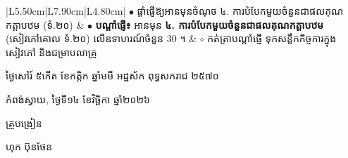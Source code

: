 \documentclass[a4paper,10pt]{article}
\begin{document}
{\begin{longtable}{|L{5.50cm}|L{7.90cm}|L{4.80cm}|}
$\bullet$ ផ្ដាំផ្ញើឱ្យអានមុនចំណុច ៤. ការបំបែកមួយចំនួនជាផលគុណកត្តាបឋម (ទំ.២០)
&
$\bullet$ \textbf{បណ្ដាំផ្ញើ៖} អានមុន \textbf{៤. ការបំបែកមួយចំនួនជាផលគុណកត្តាបឋម} (សៀវភៅគោល ទំ.២០) លើឧទាហរណ៍ចំនួន $30$ ។
&
$\circ$ កត់ត្រាបណ្ដាំផ្ញើ ទុកសន្លឹកកិច្ចការក្នុងសៀវភៅ និងជម្រាបលាគ្រូ \\
\hline
\end{longtable}}

\vspace{6pt}
{\centering
\hspace*{5.2cm}\begin{minipage}{11.5cm}
  \centering
  ថ្ងៃសៅរ៍ ៥កើត ខែកត្តិក ឆ្នាំមមី អដ្ឋស័ក ពុទ្ធសករាជ ២៥៧០\par
  កំពង់ស្វាយ, ថ្ងៃទី១៤ ខែវិច្ឆិកា ឆ្នាំ២០២៦\par
  \vspace{2pt}
  {\muol គ្រូបង្រៀន\par}
  \vspace{32pt}
  \hfill{\muol ហុក ប៊ុនថែន}\hspace*{1.4cm}
\end{minipage}\par}
\end{document}
